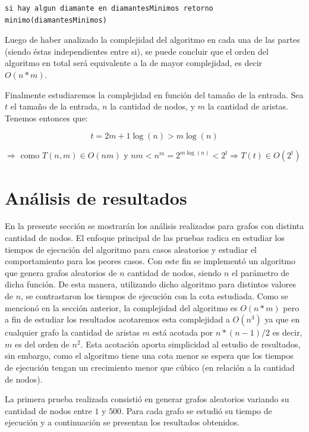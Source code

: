 \documentclass[a4paper,11pt] {article}
\begin{document}
\begin{verbatim}
si hay algun diamante en diamantesMinimos retorno minimo(diamantesMinimos)
\end{verbatim}

Luego de haber analizado la complejidad del algoritmo en cada una de las partes (siendo éstas independientes entre si), se puede concluir que el orden del algoritmo en total será equivalente a la de mayor complejidad, es decir $O(n*m)$.

\bigskip

Finalmente estudiaremos la complejidad en funci\'on del tama\~{n}o de la entrada. Sea $t$ el tama\~{n}o de la entrada, $n$ la cantidad de nodos, y $m$ la cantidad de aristas. Tenemos entonces que:

$$t=2m+1\log(n)>m\log(n)$$

\hspace{45pt} $\Longrightarrow$ como $T(n,m) \in O(nm)$ y $nm<n^{m}=2^{m\log(n)}<2^{t} \Longrightarrow T(t) \in O(2^{t})$

\section*{An\'alisis de resultados}

En la presente secci\'on se mostrar\'an los an\'alisis realizados para grafos con distinta cantidad de nodos. El enfoque principal de las pruebas radica en estudiar los tiempos de ejecuci\'on del algoritmo para casos aleatorios y estudiar el comportamiento para los peores casos. Con este fin se implement\'o un algoritmo que genera grafos aleatorios de $n$ cantidad de nodos, siendo $n$ el par\'ametro de dicha funci\'on. De esta manera, utilizando dicho algoritmo para distintos valores de $n$, se contrastaron los tiempos de ejecuci\'on con la cota estudiada. Como se mencion\'o en la secci\'on anterior, la complejidad del algoritmo es $O(n*m)$ pero a fin de estudiar los resultados acotaremos esta complejidad a $O(n^{3})$ ya que en cualquier grafo la cantidad de aristas $m$ est\'a acotada por $n*(n-1)/2$ es decir, $m$ es del orden de $n^{2}$. Esta acotaci\'on aporta simplicidad al estudio de resultados, sin embargo, como el algoritmo tiene una cota menor se espera que los tiempos de ejecuci\'on tengan un crecimiento menor que c\'ubico (en relaci\'on a la cantidad de nodos).

La primera prueba realizada consisti\'o en generar grafos aleatorios variando su cantidad de nodos entre $1$ y $500$. Para cada grafo se estudi\'o su tiempo de ejecuci\'on y a continuaci\'on se presentan los resultados obtenidos.
% 
\end{document}
